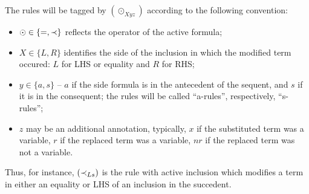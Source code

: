\noindent
The rules will be tagged by $(\odot_{Xyz})$ according to the following 
convention: 
\begin{itemize}\MyLPar
\item $\odot\in\{=,\mathbin{\prec}\}$ reflects the operator of the active 
formula; 
\item $X\in\{L,R\}$ identifies the side of the inclusion in which 
the modified term occured: $L$ for LHS  or equality and $R$ for RHS;
\item $y\in\{a,s\}$ -- $a$ if the side formula is in the 
antecedent of the sequent, and $s$ if it is in the consequent; the 
rules will be called ``a-rules'', respectively, ``s-rules'';
\item $z$ may be an additional annotation, typically, $x$ if the 
substituted term was a variable, $r$ if the replaced term was a 
variable, $nr$ if the replaced term was not a variable.
\end{itemize}
Thus, for instance, $(\mathbin{\prec}_{Ls})$ is the rule with active inclusion which 
modifies a term in either an equality or LHS of an inclusion in the 
succedent.


